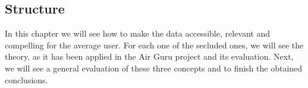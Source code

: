 \subsection*{Structure}

In this chapter we will see how to make the data accessible, relevant and compelling for 
the average user. For each one of the secluded ones, we will see the theory, as it has been applied
in the Air Guru project and its evaluation.
Next, we will see a general evaluation of these three concepts and to finish the 
obtained conclusions.
